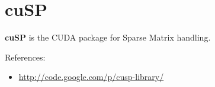 
\chapter{cuSP}
\label{chap:cusp}

{\bf cuSP} is the CUDA package for Sparse Matrix handling.

References:
\begin{itemize}
\item \url{http://code.google.com/p/cusp-library/}
\end{itemize}
